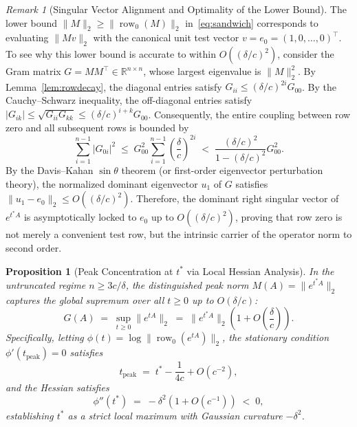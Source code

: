 \documentclass[11pt,reqno]{article}
\theoremstyle{plain}
\newtheorem{proposition}[theorem]{Proposition}
\theoremstyle{definition}
\theoremstyle{remark}
\newtheorem{remark}[theorem]{Remark}
\numberwithin{equation}{section}
\begin{document}
\begin{remark}[Singular Vector Alignment and Optimality of the Lower Bound]\label{rem:singular_vector}
The lower bound $\|M\|_2 \ge \|\operatorname{row}_0(M)\|_2$ in~\eqref{eq:sandwich} corresponds to evaluating $\|M v\|_2$ with the canonical unit test vector $v = e_0 = (1, 0, \dots, 0)^\top$. To see why this lower bound is accurate to within $O((\delta/c)^2)$, consider the Gram matrix $G = M M^\top \in \mathbb{R}^{n\times n}$, whose largest eigenvalue is $\|M\|_2^2$. By Lemma~\ref{lem:rowdecay}, the diagonal entries satisfy $G_{ii} \le (\delta/c)^{2i} G_{00}$. By the Cauchy--Schwarz inequality, the off-diagonal entries satisfy $|G_{ik}| \le \sqrt{G_{ii} G_{kk}} \le (\delta/c)^{i+k} G_{00}$. Consequently, the entire coupling between row zero and all subsequent rows is bounded by
\[
  \sum_{i=1}^{n-1} |G_{0i}|^2 \;\le\; G_{00}^2 \sum_{i=1}^{n-1} \left(\frac{\delta}{c}\right)^{2i} \;<\; \frac{(\delta/c)^2}{1 - (\delta/c)^2} G_{00}^2.
\]
By the Davis--Kahan $\sin\theta$ theorem (or first-order eigenvector perturbation theory), the normalized dominant eigenvector $u_1$ of $G$ satisfies $\|u_1 - e_0\|_2 \le O((\delta/c)^2)$. Therefore, the dominant right singular vector of $e^{t^*A}$ is asymptotically locked to $e_0$ up to $O((\delta/c)^2)$, proving that row zero is not merely a convenient test row, but the intrinsic carrier of the operator norm to second order.
\end{remark}

\begin{proposition}[Peak Concentration at $t^*$ via Local Hessian Analysis]\label{prop:peak}
In the untruncated regime $n \ge 3c/\delta$, the distinguished peak norm $M(A) = \|e^{t^*A}\|_2$ captures the global supremum over all $t \ge 0$ up to $O(\delta/c)$:
\begin{equation}\label{eq:peakloc}
  G(A) \;=\; \sup_{t \ge 0} \|e^{tA}\|_2 \;=\; \|e^{t^*A}\|_2 \left(1 + O\left(\frac{\delta}{c}\right)\right).
\end{equation}
Specifically, letting $\phi(t) = \log \|\operatorname{row}_0(e^{tA})\|_2$, the stationary condition $\phi'(t_{\mathrm{peak}}) = 0$ satisfies
\begin{equation}\label{eq:tpeak_shift}
  t_{\mathrm{peak}} \;=\; t^* - \frac{1}{4c} + O(c^{-2}),
\end{equation}
and the Hessian satisfies
\begin{equation}\label{eq:hessian}
  \phi''(t^*) \;=\; -\delta^2 \left(1 + O(c^{-1})\right) \;<\; 0,
\end{equation}
establishing $t^*$ as a strict local maximum with Gaussian curvature $-\delta^2$.
\end{proposition}
\end{document}
